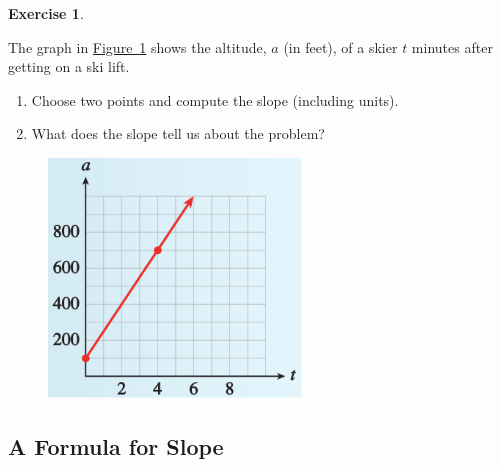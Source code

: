 \documentclass[10pt,]{book}
\theoremstyle{plain}
\theoremstyle{definition}
\newtheorem{exercise}[theorem]{Exercise}
\theoremstyle{definition}
\numberwithin{equation}{section}
\begin{document}
\begin{exercise}\label{example-ski-lift}

    The graph in \hyperref[fig-ski-lift]{Figure~\ref{fig-ski-lift}} shows the altitude, \(a\) (in feet), of a skier \(t\) minutes after getting on a ski lift.
    \leavevmode%
\begin{enumerate}[label=*\alph**]
\item\hypertarget{li-149}{}Choose two points and compute the slope (including units).\item\hypertarget{li-150}{}What does the slope tell us about the problem?\end{enumerate}
\leavevmode%
\begin{figure}
\centering
\includegraphics[width=0.60\textwidth,]{images/fig-ski-lift.svg}\caption{\label{fig-ski-lift}}
\end{figure}
\end{exercise}
\typeout{************************************************}
\typeout{************************************************}
\subsection[A Formula for Slope]{A Formula for Slope}\label{subsection-23}
\end{document}
